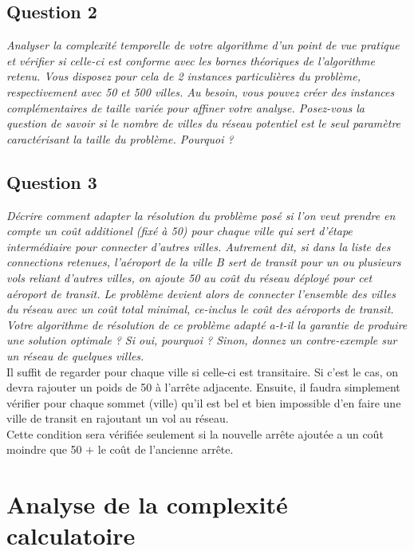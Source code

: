 \documentclass[11pt]{article}
\begin{document}
\subsection*{Question 2}
\textit{Analyser la complexité temporelle de votre algorithme d’un point de vue pratique
et vérifier si celle-ci est conforme avec les bornes théoriques de l’algorithme retenu.
Vous disposez pour cela de 2 instances particulières du problème, respectivement
avec 50 et 500 villes. Au besoin, vous pouvez créer des instances complémentaires
de taille variée pour affiner votre analyse. Posez-vous la question de
savoir si le nombre de villes du réseau potentiel est le seul paramètre caractérisant
la taille du problème. Pourquoi ?} \\



\subsection*{Question 3}
\textit{Décrire comment adapter la résolution du problème posé si l’on veut prendre en
compte un coût additionel (fixé à 50) pour chaque ville qui sert d’étape intermédiaire pour connecter d’autres villes. Autrement dit, si dans la liste des connections retenues, l’aéroport de la ville B sert de transit pour un ou plusieurs vols reliant d’autres villes, on ajoute 50 au coût du réseau déployé pour cet aéroport de transit. Le problème devient alors de connecter l’ensemble des villes du réseau avec un coût total minimal, ce-inclus le coût des aéroports de transit. Votre algorithme de résolution de ce problème adapté a-t-il la garantie de produire une solution optimale ? Si oui, pourquoi ? Sinon, donnez un contre-exemple sur un réseau de quelques villes.} \\

Il suffit de regarder pour chaque ville si celle-ci est transitaire. Si c'est le cas, on devra rajouter un poids de 50 à l'arrête adjacente. Ensuite, il faudra simplement vérifier pour chaque sommet (ville) qu'il est bel et bien impossible d'en faire une ville de transit en rajoutant un vol au réseau. \\
Cette condition sera vérifiée seulement si la nouvelle arrête ajoutée a un coût moindre que 50 $+$ le coût de l'ancienne arrête. 


\section{Analyse de la complexité calculatoire}
\end{document}
